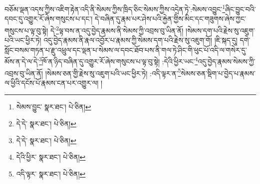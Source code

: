 བཅོམ་ལྡན་འདས་ཀྱིས་འཇིག་རྟེན་འདི་ནི་སེམས་ཀྱིས་ཁྲིད་ཅིང་སེམས་ཀྱིས་འདྲེན་ཏེ་:སེམས་འབྱུང་\footnote{སེམས་བྱུང་  སྣར་ཐང་།  པེ་ཅིན། }ཞིང་བྱུང་བའི་དབང་དུ་འགྱུར་རོ་ཞེས་གསུངས་པ་དང་། དེ་བཞིན་དུ་རྣམ་པར་ཤེས་པའི་རྐྱེན་གྱིས་མིང་དང་གཟུགས་ཞེས་ཀྱང་གསུངས་པ་ལྟ་བུ་སྟེ། དེ་\footnote{དེ་དེ་  སྣར་ཐང་།  པེ་ཅིན། }ལྟ་བས་ན་འདུ་བྱེད་རྣམས་ནི་སེམས་ཀྱི་འབྲས་བུ་ཡིན་ནོ། །སེམས་དག་པའི་རྗེས་སུ་འཇུག་པའི་ཡང་ཕྱིར་ཏེ། འདུ་བྱེད་རྣམས་ནི་རྣལ་འབྱོར་པ་རྣམས་ཀྱི་སེམས་དག་པའི་རྗེས་སུ་འཇུག་གོ། །ཇི་སྐད་དུ། དགེ་སློང་བསམ་གཏན་པ་རྫུ་འཕྲུལ་དང་ལྡན་པ་སེམས་ལ་དབང་ཐོབ་པས་ནི་གལ་ཏེ་ཤིང་གི་ཕུང་པོ་འདི་ལ་གསེར་དུ་མོས་ན་དེ་ལ་དེ་\footnote{དེ་དེ་  སྣར་ཐང་།  པེ་ཅིན། }ཁོ་ན་ཉིད་བཞིན་དུ་འགྱུར་རོ་ཞེས་གསུངས་པ་ལྟ་བུ་སྟེ། :དེའི་ཕྱིར་ཡང་\footnote{དེའི་ཕྱིར་  སྣར་ཐང་།  པེ་ཅིན། }འདུ་བྱེད་རྣམས་སེམས་ཀྱི་འབྲས་བུ་ཡིན་ནོ། །སེམས་ཅན་གྱི་རྗེས་སུ་འཇུག་པའི་ཡང་ཕྱིར་ཏེ། :འདི་ལྟར་ན་\footnote{འདི་ལྟར་  སྣར་ཐང་།  པེ་ཅིན། }སེམས་ཅན་སྡིག་པ་བྱེད་པ་རྣམས་ལ་ཕྱིའི་དངོས་པོ་རྣམས་ངན་པར་འགྱུར་ལ། །
